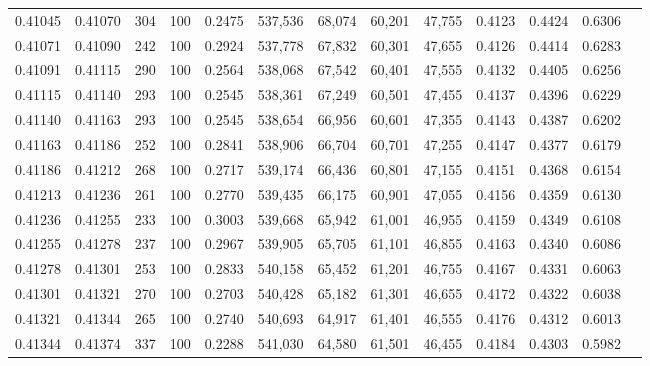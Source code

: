 \begin{tabular}{rrrrrrrrrrrrr}
0.41045 & 0.41070 &    304 & 100 &                                     0.2475 & 537,536 &  68,074 &  60,201 &  47,755 & 0.4123 & 0.4424 & 0.6306 \\
0.41071 & 0.41090 &    242 & 100 &                                     0.2924 & 537,778 &  67,832 &  60,301 &  47,655 & 0.4126 & 0.4414 & 0.6283 \\
0.41091 & 0.41115 &    290 & 100 &                                     0.2564 & 538,068 &  67,542 &  60,401 &  47,555 & 0.4132 & 0.4405 & 0.6256 \\
0.41115 & 0.41140 &    293 & 100 &                                     0.2545 & 538,361 &  67,249 &  60,501 &  47,455 & 0.4137 & 0.4396 & 0.6229 \\
0.41140 & 0.41163 &    293 & 100 &                                     0.2545 & 538,654 &  66,956 &  60,601 &  47,355 & 0.4143 & 0.4387 & 0.6202 \\
0.41163 & 0.41186 &    252 & 100 &                                     0.2841 & 538,906 &  66,704 &  60,701 &  47,255 & 0.4147 & 0.4377 & 0.6179 \\
0.41186 & 0.41212 &    268 & 100 &                                     0.2717 & 539,174 &  66,436 &  60,801 &  47,155 & 0.4151 & 0.4368 & 0.6154 \\
0.41213 & 0.41236 &    261 & 100 &                                     0.2770 & 539,435 &  66,175 &  60,901 &  47,055 & 0.4156 & 0.4359 & 0.6130 \\
0.41236 & 0.41255 &    233 & 100 &                                     0.3003 & 539,668 &  65,942 &  61,001 &  46,955 & 0.4159 & 0.4349 & 0.6108 \\
0.41255 & 0.41278 &    237 & 100 &                                     0.2967 & 539,905 &  65,705 &  61,101 &  46,855 & 0.4163 & 0.4340 & 0.6086 \\
0.41278 & 0.41301 &    253 & 100 &                                     0.2833 & 540,158 &  65,452 &  61,201 &  46,755 & 0.4167 & 0.4331 & 0.6063 \\
0.41301 & 0.41321 &    270 & 100 &                                     0.2703 & 540,428 &  65,182 &  61,301 &  46,655 & 0.4172 & 0.4322 & 0.6038 \\
0.41321 & 0.41344 &    265 & 100 &                                     0.2740 & 540,693 &  64,917 &  61,401 &  46,555 & 0.4176 & 0.4312 & 0.6013 \\
0.41344 & 0.41374 &    337 & 100 &                                     0.2288 & 541,030 &  64,580 &  61,501 &  46,455 & 0.4184 & 0.4303 & 0.5982 \\

\end{tabular}
